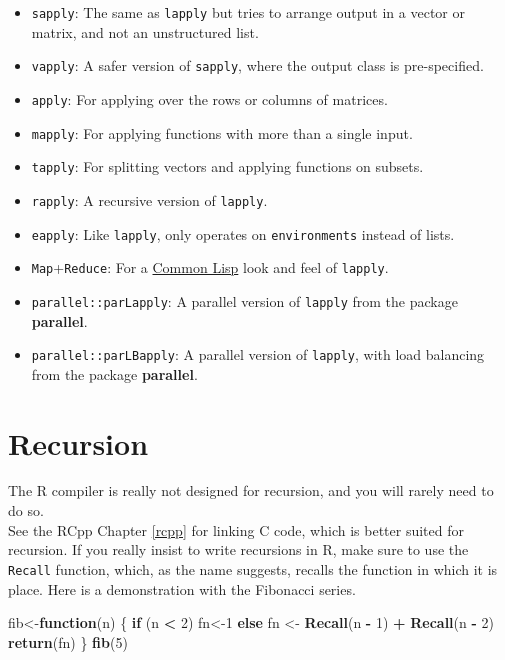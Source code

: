 \documentclass[]{book}
\newenvironment{Shaded}{\begin{snugshade}}{\end{snugshade}}
\newcommand{\KeywordTok}[1]{\textcolor[rgb]{0.13,0.29,0.53}{\textbf{#1}}}
\newcommand{\DecValTok}[1]{\textcolor[rgb]{0.00,0.00,0.81}{#1}}
\newcommand{\StringTok}[1]{\textcolor[rgb]{0.31,0.60,0.02}{#1}}
\newcommand{\ControlFlowTok}[1]{\textcolor[rgb]{0.13,0.29,0.53}{\textbf{#1}}}
\newcommand{\OperatorTok}[1]{\textcolor[rgb]{0.81,0.36,0.00}{\textbf{#1}}}
\newcommand{\NormalTok}[1]{#1}
\providecommand{\tightlist}{%
  \setlength{\itemsep}{0pt}\setlength{\parskip}{0pt}}
\theoremstyle{definition}
\theoremstyle{definition}
\theoremstyle{definition}
\theoremstyle{remark}
\begin{document}
\begin{itemize}
\tightlist
\item
  \texttt{sapply}: The same as \texttt{lapply} but tries to arrange
  output in a vector or matrix, and not an unstructured list.
\item
  \texttt{vapply}: A safer version of \texttt{sapply}, where the output
  class is pre-specified.
\item
  \texttt{apply}: For applying over the rows or columns of matrices.
\item
  \texttt{mapply}: For applying functions with more than a single input.
\item
  \texttt{tapply}: For splitting vectors and applying functions on
  subsets.
\item
  \texttt{rapply}: A recursive version of \texttt{lapply}.
\item
  \texttt{eapply}: Like \texttt{lapply}, only operates on
  \texttt{environments} instead of lists.
\item
  \texttt{Map}+\texttt{Reduce}: For a
  \href{https://en.wikipedia.org/wiki/Common_Lisp}{Common Lisp} look and
  feel of \texttt{lapply}.
\item
  \texttt{parallel::parLapply}: A parallel version of \texttt{lapply}
  from the package \textbf{parallel}.
\item
  \texttt{parallel::parLBapply}: A parallel version of \texttt{lapply},
  with load balancing from the package \textbf{parallel}.
\end{itemize}

\section{Recursion}\label{recursion}

The R compiler is really not designed for recursion, and you will rarely
need to do so.\\
See the RCpp Chapter \ref{rcpp} for linking C code, which is better
suited for recursion. If you really insist to write recursions in R,
make sure to use the \texttt{Recall} function, which, as the name
suggests, recalls the function in which it is place. Here is a
demonstration with the Fibonacci series.

\begin{Shaded}
\begin{Highlighting}[]
\NormalTok{fib<-}\ControlFlowTok{function}\NormalTok{(n) \{}
    \ControlFlowTok{if}\NormalTok{ (n }\OperatorTok{<}\StringTok{ }\DecValTok{2}\NormalTok{) fn<-}\DecValTok{1} 
    \ControlFlowTok{else}\NormalTok{ fn <-}\StringTok{ }\KeywordTok{Recall}\NormalTok{(n }\OperatorTok{-}\StringTok{ }\DecValTok{1}\NormalTok{) }\OperatorTok{+}\StringTok{ }\KeywordTok{Recall}\NormalTok{(n }\OperatorTok{-}\StringTok{ }\DecValTok{2}\NormalTok{) }
    \KeywordTok{return}\NormalTok{(fn)}
\NormalTok{\} }
\KeywordTok{fib}\NormalTok{(}\DecValTok{5}\NormalTok{)}
\end{Highlighting}
\end{Shaded}
\end{document}
